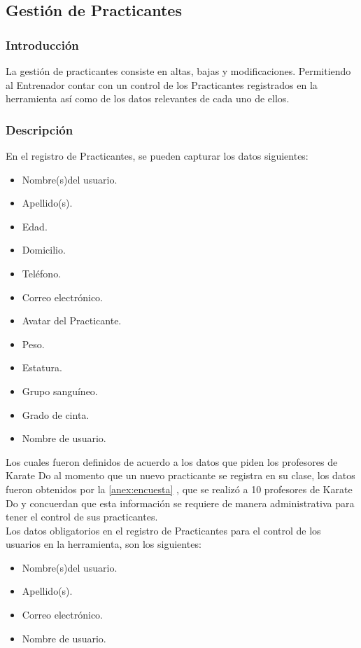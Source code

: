 \subsection{Gestión de Practicantes}

\subsubsection{Introducción}
La gestión de practicantes consiste en altas, bajas y modificaciones. Permitiendo al Entrenador contar con un control de los Practicantes registrados en la herramienta así como de los datos relevantes de cada uno de ellos.

\subsubsection{Descripción}

En el registro de Practicantes, se pueden capturar los datos siguientes:

	\begin{itemize} \itemsep1pt \parskip0pt 
			\item Nombre(s)del usuario.
			\item Apellido(s).
			\item Edad.
			\item Domicilio.
			\item Teléfono.
			\item Correo electrónico.
			\item Avatar del Practicante.
			\item Peso.
			\item Estatura.
			\item Grupo sanguíneo.
			\item Grado de cinta.
			\item Nombre de usuario.
	\end{itemize}

Los cuales fueron definidos de acuerdo a los datos que piden los profesores de Karate Do al momento que un nuevo practicante se registra en su clase, los datos fueron obtenidos por la \ref{anex:encuesta} , que se realizó a 10 profesores de Karate Do y concuerdan que esta información se requiere de manera administrativa para  tener el control de  sus practicantes.\\

Los datos obligatorios en el registro de Practicantes para el control de los usuarios en la herramienta, son los siguientes:
		\begin{itemize} \itemsep1pt \parskip0pt 
			\item Nombre(s)del usuario.
			\item Apellido(s).
			\item Correo electrónico.
			\item Nombre de usuario.
		\end{itemize}

